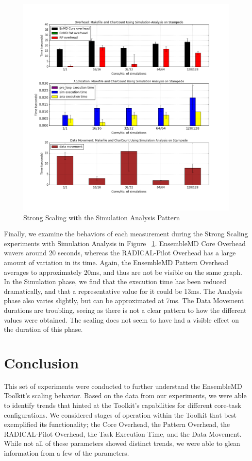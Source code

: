 \documentclass[]{article}
\begin{document}
		\begin{figure}[H]
			\centering
			\includegraphics[scale=.30]{iteration_3/sa_strong_scaling.png}
			\caption{Strong Scaling with the Simulation Analysis Pattern}
			\label{fig:sa_strong_scaling}
		\end{figure}
		
		Finally, we examine the behaviors of each measurement during the Strong Scaling experiments with Simulation Analysis in Figure ~\ref{fig:sa_strong_scaling}. EnsembleMD Core Overhead wavers around 20 seconds, whereas the RADICAL-Pilot Overhead has a large amount of variation in its time. Again, the EnsembleMD Pattern Overhead averages to approximately 20ms, and thus are not be visible on the same graph.
		In the Simulation phase, we find that the execution time has been reduced dramatically, and that a representative value for it could be 13ms. The Analysis phase also varies slightly, but can be approximated at 7ms.
		The Data Movement durations are troubling, seeing as there is not a clear pattern to how the different values were obtained. The scaling does not seem to have had a visible effect on the duration of this phase.

\section{Conclusion}
	This set of experiments were conducted to further understand the EnsembleMD Toolkit's scaling behavior. Based on the data from our experiments, we were able to identify trends that hinted at the Toolkit's capabilities for different core-task configurations. We considered stages of operation within the Toolkit that best exemplified its functionality; the Core Overhead, the Pattern Overhead, the RADICAL-Pilot Overhead, the Task Execution Time, and the Data Movement. While not all of these parameters showed distinct trends, we were able to glean information from a few of the parameters.
\end{document}
